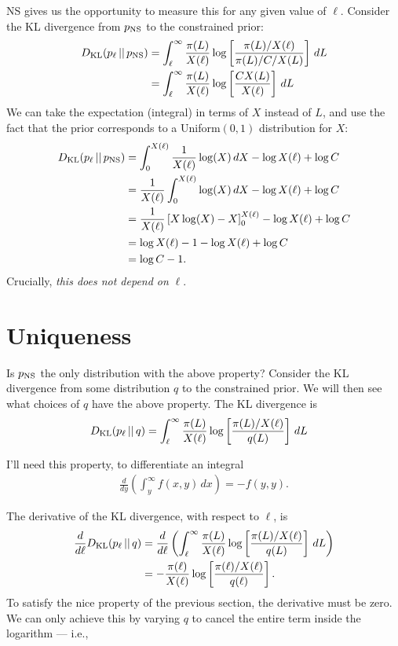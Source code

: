 \documentclass[a4paper, 12pt]{article}
\begin{document}
NS gives us the opportunity to measure this for any given
value of $\ell$. Consider the KL divergence from $p_{\rm NS}$ to
the constrained prior:
\begin{align}
D_{\rm KL}(p_\ell \,||\, p_{\rm NS})
  &= \int_{\ell}^{\infty} \frac{\pi(L)}{X(\ell)}
           \log\left[\frac{\pi(L)/X(\ell)}{\pi(L)/C/X(L)}\right] \, dL \\
  &= \int_{\ell}^{\infty} \frac{\pi(L)}{X(\ell)}
           \log\left[\frac{CX(L)}{X(\ell)}\right] \, dL
\end{align}
We can take the expectation (integral) in terms of $X$ instead of
$L$, and use the fact that the prior corresponds to a
Uniform$(0,1)$ distribution for $X$:
\begin{align}
D_{\rm KL}(p_\ell \,||\, p_{\rm NS})
    &= \int_0^{X(\ell)} \frac{1}{X(\ell)}
           \log(X) \, dX - \log X(\ell) + \log C \\
    &= \frac{1}{X(\ell)} \int_0^{X(\ell)} \log(X) \, dX
           - \log X(\ell) + \log C \\
    &= \frac{1}{X(\ell)}\left[X\log(X) - X\right]_0^{X(\ell)}
           - \log X(\ell) + \log C \\
    &= \log X(\ell) - 1 - \log X(\ell) + \log C \\
    &= \log C - 1.
\end{align}
Crucially, {\em this does not depend on} $\ell$.

\section{Uniqueness}
Is $p_{\rm NS}$ the only distribution with the above property?
Consider the KL divergence from some distribution $q$
to the constrained prior.
We will then see what choices of $q$ have the above property.
The KL divergence is
\begin{align}
D_{\rm KL}(p_\ell \,||\, q)
  &= \int_{\ell}^{\infty} \frac{\pi(L)}{X(\ell)}
           \log\left[\frac{\pi(L)/X(\ell)}{q(L)}\right] \, dL
\end{align}

I'll need this property, to differentiate an integral
\begin{align}
\frac{d}{dy}\left(\int_y^\infty f(x, y) \, dx\right)
  = -f(y, y).
\end{align}

The derivative of the KL divergence, with respect to $\ell$, is
\begin{align}
\frac{d}{d\ell} D_{\rm KL}(p_\ell \,||\, q)
  &= \frac{d}{d\ell}\left(\int_{\ell}^{\infty} \frac{\pi(L)}{X(\ell)}
           \log\left[\frac{\pi(L)/X(\ell)}{q(L)}\right] \, dL\right) \\
  &= -\frac{\pi(\ell)}{X(\ell)}
           \log\left[\frac{\pi(\ell)/X(\ell)}{q(\ell)}\right].
\end{align}
To satisfy the nice property of the previous section, the derivative
must be zero. We can only achieve this by varying $q$ to cancel
the entire term inside the logarithm --- i.e., 
\end{document}
